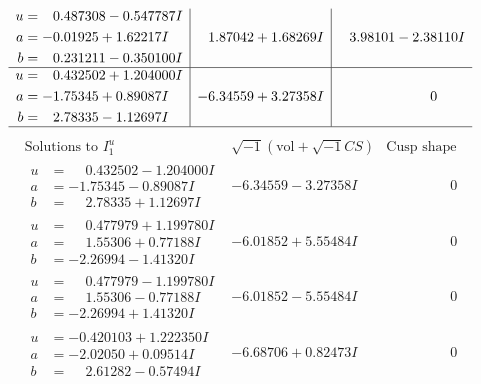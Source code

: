 \documentclass[1p]{elsarticle_modified}
\theoremstyle{definition}
\newcommand{\I}{\sqrt{-1}}
\begin{document}
$$\begin{array}{c|c|c}
\begin{aligned}
u &= \phantom{-}0.487308 - 0.547787 I \\
a &= -0.01925 + 1.62217 I \\
b &= \phantom{-}0.231211 - 0.350100 I\end{aligned}
 & \phantom{-}1.87042 + 1.68269 I & \phantom{-}3.98101 - 2.38110 I \\ \hline\begin{aligned}
u &= \phantom{-}0.432502 + 1.204000 I \\
a &= -1.75345 + 0.89087 I \\
b &= \phantom{-}2.78335 - 1.12697 I\end{aligned}
 & -6.34559 + 3.27358 I & \phantom{-0.000000 } 0\\
 \hline 
 \end{array}$$\newpage$$\begin{array}{c|c|c}  
\text{Solutions to }I^u_{1}& \I (\text{vol} + \sqrt{-1}CS) & \text{Cusp shape}\\
 \hline 
\begin{aligned}
u &= \phantom{-}0.432502 - 1.204000 I \\
a &= -1.75345 - 0.89087 I \\
b &= \phantom{-}2.78335 + 1.12697 I\end{aligned}
 & -6.34559 - 3.27358 I & \phantom{-0.000000 } 0 \\ \hline\begin{aligned}
u &= \phantom{-}0.477979 + 1.199780 I \\
a &= \phantom{-}1.55306 + 0.77188 I \\
b &= -2.26994 - 1.41320 I\end{aligned}
 & -6.01852 + 5.55484 I & \phantom{-0.000000 } 0 \\ \hline\begin{aligned}
u &= \phantom{-}0.477979 - 1.199780 I \\
a &= \phantom{-}1.55306 - 0.77188 I \\
b &= -2.26994 + 1.41320 I\end{aligned}
 & -6.01852 - 5.55484 I & \phantom{-0.000000 } 0 \\ \hline\begin{aligned}
u &= -0.420103 + 1.222350 I \\
a &= -2.02050 + 0.09514 I \\
b &= \phantom{-}2.61282 - 0.57494 I\end{aligned}
 & -6.68706 + 0.82473 I & \phantom{-0.000000 } 0 \\ \hline\begin{aligned}

\end{aligned}
\end{array}$$
\end{document}
